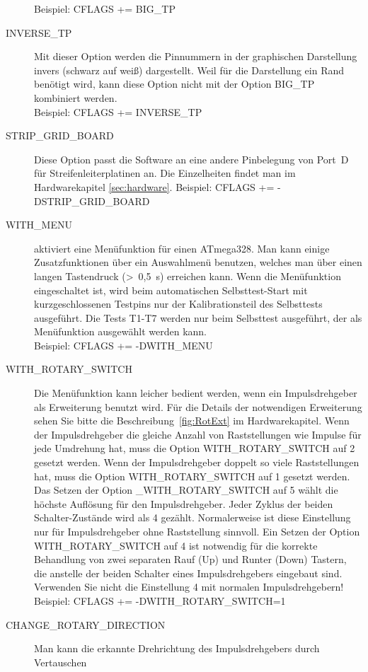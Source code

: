 \begin{description}
Beispiel: CFLAGS += BIG\_TP
 \item[INVERSE\_TP] Mit dieser Option werden die Pinnummern in der graphischen Darstellung invers (schwarz auf weiß) dargestellt.
Weil für die Darstellung ein Rand benötigt wird, kann diese Option nicht mit der Option BIG\_TP kombiniert werden.\\
Beispiel: CFLAGS += INVERSE\_TP
  \item[STRIP\_GRID\_BOARD] Diese Option passt die Software an eine andere Pinbelegung von Port~D für Streifenleiterplatinen an.
Die Einzelheiten findet man im Hardwarekapitel \ref{sec:hardware}.
Beispiel: CFLAGS += -DSTRIP\_GRID\_BOARD
  \item[WITH\_MENU] aktiviert eine Menüfunktion für einen ATmega328. Man kann einige Zusatzfunktionen über ein
Auswahlmenü benutzen, welches man über einen langen Tastendruck (\textgreater~0,5~s) erreichen kann.
Wenn die Menüfunktion eingeschaltet ist, wird beim automatischen Selbsttest-Start mit kurzgeschlossenen Testpins
 nur der Kalibrationsteil des Selbsttests ausgeführt.
Die Tests T1-T7 werden nur beim Selbsttest ausgeführt, der als Menüfunktion ausgewählt werden kann.\\
Beispiel: CFLAGS += -DWITH\_MENU
  \item[WITH\_ROTARY\_SWITCH] Die Menüfunktion kann leicher bedient werden, wenn ein Impulsdrehgeber als Erweiterung
benutzt wird.
Für die Details der notwendigen Erweiterung sehen Sie bitte die Beschreibung~\ref{fig:RotExt} im Hardwarekapitel.
Wenn der Impulsdrehgeber die gleiche Anzahl von Raststellungen wie Impulse für jede Umdrehung hat,
muss die Option WITH\_ROTARY\_SWITCH auf 2 gesetzt werden.
Wenn der Impulsdrehgeber doppelt so viele Raststellungen hat, muss die Option WITH\_ROTARY\_SWITCH auf 1 gesetzt werden.
Das Setzen der Option \_WITH\_ROTARY\_SWITCH auf 5 wählt die höchste Auflösung für den Impulsdrehgeber.
Jeder Zyklus der beiden Schalter-Zustände wird als 4 gezählt. Normalerweise ist diese Einstellung nur für
Impulsdrehgeber ohne Raststellung sinnvoll.
Ein Setzen der Option WITH\_ROTARY\_SWITCH auf 4 ist notwendig für die korrekte Behandlung von zwei separaten
Rauf (Up) und Runter (Down) Tastern, die anstelle der beiden Schalter eines Impulsdrehgebers eingebaut sind.
Verwenden Sie nicht die Einstellung 4 mit normalen Impulsdrehgebern!\\
Beispiel: CFLAGS += -DWITH\_ROTARY\_SWITCH=1
  \item[CHANGE\_ROTARY\_DIRECTION] Man kann die erkannte Drehrichtung des Impulsdrehgebers durch Vertauschen

\end{description}
